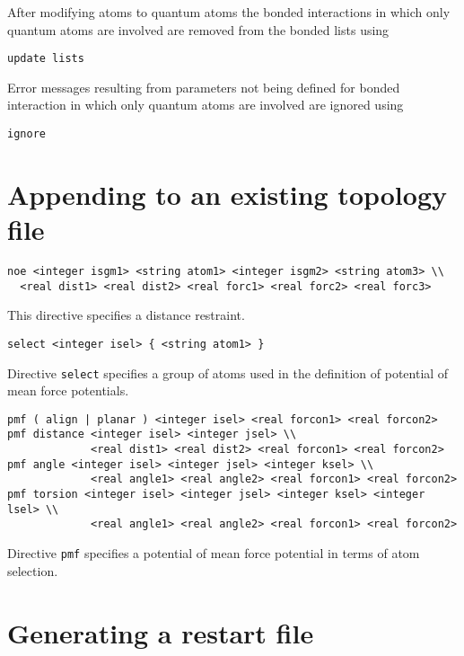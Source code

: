 After modifying atoms to quantum atoms the bonded interactions in which
only quantum atoms are involved are removed from the bonded lists using

\begin{verbatim}
update lists
\end{verbatim}

Error messages resulting from parameters not being defined for bonded
interaction in which only quantum atoms are involved are ignored using

\begin{verbatim}
ignore
\end{verbatim}

\section{Appending to an existing topology file}

\begin{verbatim}
noe <integer isgm1> <string atom1> <integer isgm2> <string atom3> \\
  <real dist1> <real dist2> <real forc1> <real forc2> <real forc3>
\end{verbatim}

This directive specifies a distance restraint.

\begin{verbatim}
select <integer isel> { <string atom1> }
\end{verbatim}

Directive \verb+select+ specifies a group of atoms used in the
definition of potential of mean force potentials.

\begin{verbatim}
pmf ( align | planar ) <integer isel> <real forcon1> <real forcon2>
pmf distance <integer isel> <integer jsel> \\
             <real dist1> <real dist2> <real forcon1> <real forcon2>
pmf angle <integer isel> <integer jsel> <integer ksel> \\
             <real angle1> <real angle2> <real forcon1> <real forcon2>
pmf torsion <integer isel> <integer jsel> <integer ksel> <integer lsel> \\
             <real angle1> <real angle2> <real forcon1> <real forcon2>
\end{verbatim}

Directive \verb+pmf+ specifies a potential of mean force potential
in terms of atom selection.

\section{Generating a restart file}

